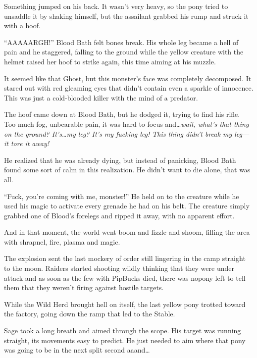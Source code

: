 Something jumped on his back. It wasn't very heavy, so the pony tried to unsaddle it by shaking himself, but the assailant grabbed his rump and struck it with a hoof.

``AAAAARGH!'' Blood Bath felt bones break. His whole leg became a hell of pain and he staggered, falling to the ground while the yellow creature with the helmet raised her hoof to strike again, this time aiming at his muzzle.

It seemed like that Ghost, but this monster's face was completely decomposed. It stared out with red gleaming eyes that didn't contain even a sparkle of innocence. This was just a cold-blooded killer with the mind of a predator.

The hoof came down at Blood Bath, but he dodged it, trying to find his rifle. Too much fog, unbearable pain, it was hard to focus and\dots \emph{wait, what's that thing on the ground? It's\dots my leg? It's my fucking leg! This thing didn't break my leg---it tore it away!}


He realized that he was already dying, but instead of panicking, Blood Bath found some sort of calm in this realization. He didn't want to die alone, that was all.

``Fuck, you're coming with me, monster!'' He held on to the creature while he used his magic to activate every grenade he had on his belt. The creature simply grabbed one of Blood's forelegs and ripped it away, with no apparent effort.

And in that moment, the world went boom and fizzle and shoom, filling the area with shrapnel, fire, plasma and magic.

The explosion sent the last mockery of order still lingering in the camp straight to the moon. Raiders started shooting wildly thinking that they were under attack and as soon as the few with PipBucks died, there was nopony left to tell them that they weren't firing against hostile targets.

While the Wild Herd brought hell on itself, the last yellow pony trotted toward the factory, going down the ramp that led to the Stable.



\horizonline


Sage took a long breath and aimed through the scope. His target was running straight, its movements easy to predict. He just needed to aim where that pony was going to be in the next split second aaand\dots

